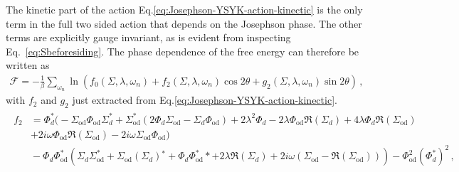 The kinetic part of the action Eq.\eqref{eq:Josephson-YSYK-action-kinectic}
is the only term in the full two sided action that depends on the Josephson phase. The other terms are explicitly gauge invariant, as is evident from inspecting Eq.~\eqref{eq:Sbeforesiding}. The phase dependence of the free energy can therefore be written as 
\begin{align}
    \mathcal{F}  = -\frac{1}{\beta}\sum_{\omega_n}\ln\left( f_0(\Sigma,\lambda,\omega_n) + f_2(\Sigma,\lambda,\omega_n)\cos{2\theta} + g_2(\Sigma,\lambda,\omega_n)\sin{2\theta}\right) \,,
    \label{eq:exactFEJosWH}
\end{align}
with $f_2$ and $g_2$ just extracted from Eq.\eqref{eq:Josephson-YSYK-action-kinectic}.
\begin{align}
\begin{split}
   f_2 &= \Phi _d^\ast \Big(-\Sigma _{\text{od}} \Phi _{\text{od}} \Sigma _d^\ast+\Sigma _{\text{od}}^\ast \left(2 \Phi _d \Sigma _{\text{od}}-\Sigma _d \Phi _{\text{od}}\right)+2 \lambda ^2 \Phi _d-2 \lambda  \Phi _{\text{od}} \Re\left(\Sigma _d\right) 
    + 4 \lambda  \Phi _d \Re\left(\Sigma _{\text{od}}\right) \\
    &+ 2 i \omega  \Phi _{\text{od}} \Re\left(\Sigma _{\text{od}}\right)-2 i \omega  \Sigma _{\text{od}} \Phi _{\text{od}}\Big) \\ 
   &{} -\Phi _d \Phi _{\text{od}}^\ast \left(\Sigma _d \Sigma _{\text{od}}^\ast+\Sigma _{\text{od}} \left(\Sigma _d\right){}^*+\Phi _d \Phi _{\text{od}}^*\ast +2 \lambda  \Re\left(\Sigma _d\right)+2 i \omega  \left(\Sigma _{\text{od}}-\Re\left(\Sigma _{\text{od}}\right)\right)\right) 
    - \Phi _{\text{od}}^2 \left(\Phi_d^\ast\right)^2 \, , \nonumber
\end{split}
\end{align}
